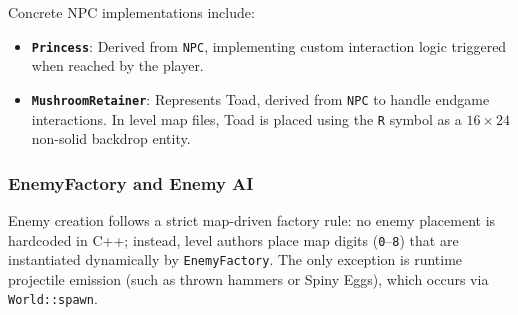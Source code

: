 \documentclass[12pt, a4paper]{article}
\begin{document}
Concrete NPC implementations include:
\begin{itemize}
\item \textbf{\texttt{Princess}}: Derived from \texttt{NPC}, implementing custom interaction logic triggered when reached by the player.
\item \textbf{\texttt{MushroomRetainer}}: Represents Toad, derived from \texttt{NPC} to handle endgame interactions. In level map files, Toad is placed using the \texttt{R} symbol as a $16 \times 24$ non-solid backdrop entity.
\end{itemize}

\subsubsection{EnemyFactory and Enemy AI}

Enemy creation follows a strict map-driven factory rule: no enemy placement is hardcoded in C++; instead, level authors place map digits (\texttt{0}--\texttt{8}) that are instantiated dynamically by \texttt{EnemyFactory}. The only exception is runtime projectile emission (such as thrown hammers or Spiny Eggs), which occurs via \texttt{World::spawn}.
\end{document}

